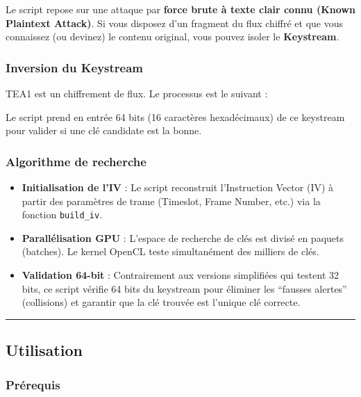 \documentclass[
  french,
]{article}
\providecommand{\tightlist}{%
  \setlength{\itemsep}{0pt}\setlength{\parskip}{0pt}}
\begin{document}
Le script repose sur une attaque par \textbf{force brute à texte clair
connu (Known Plaintext Attack)}. Si vous disposez d'un fragment du flux
chiffré et que vous connaissez (ou devinez) le contenu original, vous
pouvez isoler le \textbf{Keystream}.

\subsubsection{Inversion du Keystream}\label{inversion-du-keystream}

TEA1 est un chiffrement de flux. Le processus est le suivant :

Le script prend en entrée 64 bits (16 caractères hexadécimaux) de ce
keystream pour valider si une clé candidate est la bonne.

\subsubsection{Algorithme de recherche}\label{algorithme-de-recherche}

\begin{itemize}
\tightlist
\item
  \textbf{Initialisation de l'IV} : Le script reconstruit l'Instruction
  Vector (IV) à partir des paramètres de trame (Timeslot, Frame Number,
  etc.) via la fonction \texttt{build\_iv}.
\item
  \textbf{Parallélisation GPU} : L'espace de recherche de clés est
  divisé en paquets (batches). Le kernel OpenCL teste simultanément des
  milliers de clés.
\item
  \textbf{Validation 64-bit} : Contrairement aux versions simplifiées
  qui testent 32 bits, ce script vérifie 64 bits du keystream pour
  éliminer les ``fausses alertes'' (collisions) et garantir que la clé
  trouvée est l'unique clé correcte.
\end{itemize}

\begin{center}\rule{0.5\linewidth}{0.5pt}\end{center}

\subsection{Utilisation}\label{utilisation-1}

\subsubsection{Prérequis}\label{pruxe9requis-3}
\end{document}
